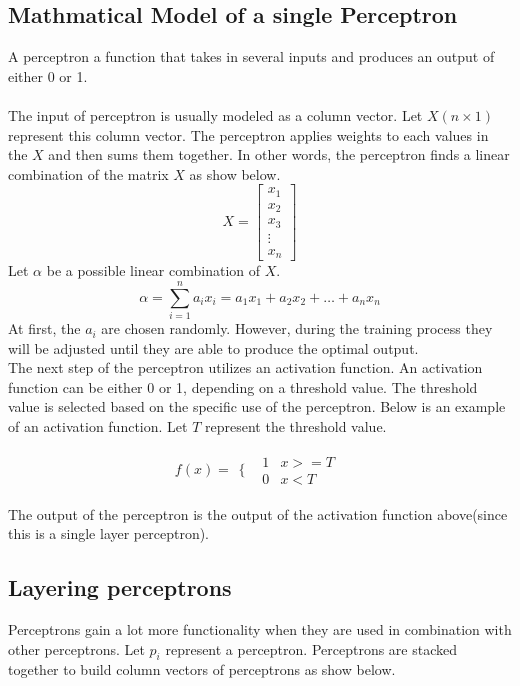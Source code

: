 
\subsection{Mathmatical Model of a single Perceptron}	
		
A perceptron  a function that takes in several inputs and produces an output of either 0 or 1.\\ \\
The input of perceptron is usually modeled as a column vector. Let $X(n\times1)$ represent this column vector. The perceptron applies weights to each values in the $X$ and then sums them together. In other words, the perceptron finds a linear combination of the matrix $X$ as show below.
$$
X = 
\begin{bmatrix}
	x_1 \\
	x_2 \\
	x_3 \\
	\vdots \\
	x_n
\end{bmatrix} 
$$
Let $\alpha$ be a possible linear combination of $X$. 
$$
	\alpha = \sum_{i=1}^{n} a_ix_i = a_1x_1 + a_2x_2 + \dots + a_nx_n
$$
At first, the $a_i$ are chosen randomly. However, during the training process they will be adjusted until they are able to produce the optimal output. \\

The next step of the perceptron utilizes an activation function. An activation function can be either 0 or 1, depending on a threshold value. The threshold value is selected based on the specific use of the perceptron. Below is an example of an activation function. Let $T$ represent the threshold value.

$$f(x) = 
	\begin{array}{cc}
  	\{ & 
    \begin{array}{cc}
    	1 & x >= T \\
    	0 & x < T
    \end{array}
\end{array}
$$

The output of the perceptron is the output of the activation function above(since this is a single layer perceptron).

\subsection{Layering perceptrons}

Perceptrons gain a lot more functionality when they are used in combination with other perceptrons. Let $p_i$ represent a perceptron. Perceptrons are stacked together to build column vectors of perceptrons as show below.

